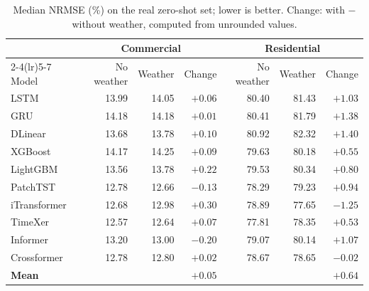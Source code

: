 \documentclass[11pt]{article}
\begin{document}
\begin{table}[H]
\centering
\small
\setlength{\tabcolsep}{5pt}
\begin{tabular}{lrrr rrr}
\toprule
& \multicolumn{3}{c}{Commercial} & \multicolumn{3}{c}{Residential} \\
\cmidrule(lr){2-4}\cmidrule(lr){5-7}
Model & No weather & Weather & Change & No weather & Weather & Change \\
\midrule
LSTM         & 13.99 & 14.05 & $+0.06$ & 80.40 & 81.43 & $+1.03$ \\
GRU          & 14.18 & 14.18 & $+0.01$ & 80.41 & 81.79 & $+1.38$ \\
DLinear      & 13.68 & 13.78 & $+0.10$ & 80.92 & 82.32 & $+1.40$ \\
XGBoost      & 14.17 & 14.25 & $+0.09$ & 79.63 & 80.18 & $+0.55$ \\
LightGBM     & 13.56 & 13.78 & $+0.22$ & 79.53 & 80.34 & $+0.80$ \\
PatchTST     & 12.78 & 12.66 & $-0.13$ & 78.29 & 79.23 & $+0.94$ \\
iTransformer & 12.68 & 12.98 & $+0.30$ & 78.89 & 77.65 & $-1.25$ \\
TimeXer      & 12.57 & 12.64 & $+0.07$ & 77.81 & 78.35 & $+0.53$ \\
Informer     & 13.20 & 13.00 & $-0.20$ & 79.07 & 80.14 & $+1.07$ \\
Crossformer  & 12.78 & 12.80 & $+0.02$ & 78.67 & 78.65 & $-0.02$ \\
\midrule
\textbf{Mean} & & & $\mathbf{+0.05}$ & & & $\mathbf{+0.64}$ \\
\bottomrule
\end{tabular}
\caption{Median NRMSE (\%) on the real zero-shot set; lower is better.
Change: with $-$ without weather, computed from unrounded values.}
\label{tab:weather-real}
\end{table}
\end{document}
